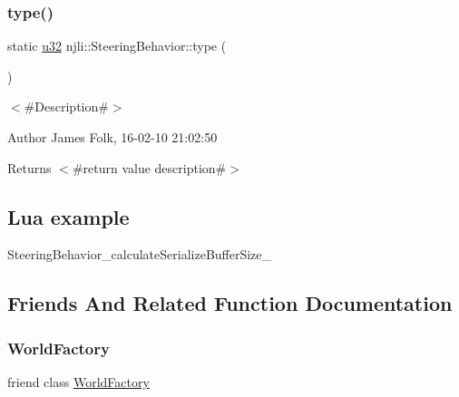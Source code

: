 \mbox{\label{classnjli_1_1_steering_behavior_a3c8ce7cce8fa14d182d917d3ee4d9b13}} 
\subsubsection{\texorpdfstring{type()}{type()}}
{\footnotesize\ttfamily static \mbox{\hyperlink{_util_8h_a10e94b422ef0c20dcdec20d31a1f5049}{u32}} njli\+::\+Steering\+Behavior\+::type (\begin{DoxyParamCaption}{ }\end{DoxyParamCaption})\hspace{0.3cm}{\ttfamily [static]}}



$<$\#\+Description\#$>$ 

\begin{DoxyAuthor}{Author}
James Folk, 16-\/02-\/10 21\+:02\+:50
\end{DoxyAuthor}
\begin{DoxyReturn}{Returns}
$<$\#return value description\#$>$
\end{DoxyReturn}
\hypertarget{classnjli_1_1_steering_behavior_wander_ex1}{}\subsection{Lua example}\label{classnjli_1_1_steering_behavior_wander_ex1}

\begin{DoxyCodeInclude}
\end{DoxyCodeInclude}
Steering\+Behavior\+\_\+calculate\+Serialize\+Buffer\+Size\+\_\+ 

\subsection{Friends And Related Function Documentation}
\mbox{\label{classnjli_1_1_steering_behavior_acb96ebb09abe8f2a37a915a842babfac}} 
\subsubsection{\texorpdfstring{World\+Factory}{WorldFactory}}
{\footnotesize\ttfamily friend class \mbox{\hyperlink{classnjli_1_1_world_factory}{World\+Factory}}\hspace{0.3cm}{\ttfamily [friend]}}



